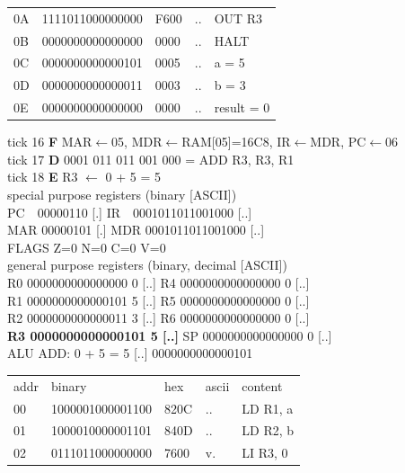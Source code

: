 \begin{tcolorbox}[stepbox, title={Instruction 5 \hfill ticks 13 to 15 \quad BLE done}]
{\begin{tabular}{@{}lllll@{}}
0A & 1111011000000000 & F600 & .. & OUT R3\\
0B & 0000000000000000 & 0000 & .. & HALT\\
\rowcolor{datac}0C & 0000000000000101 & 0005 & .. & a = 5\\
\rowcolor{datac}0D & 0000000000000011 & 0003 & .. & b = 3\\
\rowcolor{datac}0E & 0000000000000000 & 0000 & .. & result = 0\\
\end{tabular}}
\end{tcolorbox}\hfill\begin{tcolorbox}[stepbox, title={Instruction 6 \hfill ticks 16 to 18 \quad ADD R3, R3, R1}]
\textcolor{dim}{tick 16} \textbf{F} MAR$\leftarrow$05, MDR$\leftarrow$RAM[05]=16C8, IR$\leftarrow$MDR, PC$\leftarrow$06\\
\textcolor{dim}{tick 17} \textbf{D} 0001 011 011 001 000 = ADD R3, R3, R1\\
\textcolor{dim}{tick 18} \textbf{E} R3 $\leftarrow$ 0 + 5 = 5\\[2pt]
\textcolor{dim}{special purpose registers (binary [ASCII])}\\
PC~~00000110 [.] \hfill IR~~0001011011001000 [..]\\
MAR 00000101 [.] \hfill MDR 0001011011001000 [..]\\
FLAGS Z=0 N=0 C=0 V=0\\[2pt]
\textcolor{dim}{general purpose registers (binary, decimal [ASCII])}\\
R0 0000000000000000 0 [..] \hfill R4 0000000000000000 0 [..]\\
R1 0000000000000101 5 [..] \hfill R5 0000000000000000 0 [..]\\
R2 0000000000000011 3 [..] \hfill R6 0000000000000000 0 [..]\\
\textcolor{wrt}{\textbf{R3 0000000000000101 5 [..]}} \hfill SP 0000000000000000 0 [..]\\
\textcolor{dim}{ALU} ADD: 0 + 5 = 5 [..] \hfill 0000000000000101\\[2pt]
{\setlength{\tabcolsep}{2pt}\begin{tabular}{@{}lllll@{}}
\textcolor{dim}{addr} & \textcolor{dim}{binary} & \textcolor{dim}{hex} & \textcolor{dim}{ascii} & \textcolor{dim}{content}\\
00 & 1000001000001100 & 820C & .. & LD R1, a\\
01 & 1000010000001101 & 840D & .. & LD R2, b\\
02 & 0111011000000000 & 7600 & v. & LI R3, 0\\

\end{tabular}}
\end{tcolorbox}
